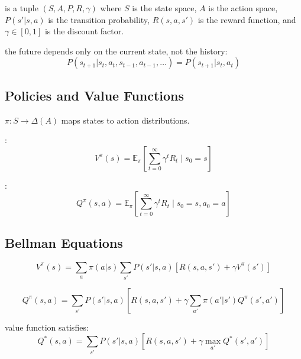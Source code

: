 
 is a tuple $(S, A, P, R, \gamma)$ where $S$ is the state space, $A$ is the action space, $P(s'|s,a)$ is the transition probability, $R(s,a,s')$ is the reward function, and $\gamma \in [0,1]$ is the discount factor.

 the future depends only on the current state, not the history:
\begin{equation}
    P(s_{t+1} | s_t, a_t, s_{t-1}, a_{t-1}, \ldots) = P(s_{t+1} | s_t, a_t)
\end{equation}

\subsection{Policies and Value Functions}

 $\pi: S \to \Delta(A)$ maps states to action distributions.

:
\begin{equation}
    V^\pi(s) = \mathbb{E}_\pi \left[ \sum_{t=0}^\infty \gamma^t R_t \mid s_0 = s \right]
\end{equation}

:
\begin{equation}
    Q^\pi(s,a) = \mathbb{E}_\pi \left[ \sum_{t=0}^\infty \gamma^t R_t \mid s_0 = s, a_0 = a \right]
\end{equation}

\subsection{Bellman Equations}


\begin{equation}
    V^\pi(s) = \sum_a \pi(a|s) \sum_{s'} P(s'|s,a) [R(s,a,s') + \gamma V^\pi(s')]
\end{equation}

\begin{equation}
    Q^\pi(s,a) = \sum_{s'} P(s'|s,a) [R(s,a,s') + \gamma \sum_{a'} \pi(a'|s') Q^\pi(s',a')]
\end{equation}

 value function satisfies:
\begin{equation}
    Q^*(s,a) = \sum_{s'} P(s'|s,a) [R(s,a,s') + \gamma \max_{a'} Q^*(s',a')]
\end{equation}


